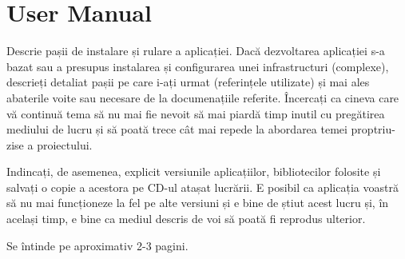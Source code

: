 
\chapter{User Manual}

\label{cap:user-manual}

Descrie pașii de instalare și rulare a aplicației. Dacă dezvoltarea aplicației s-a bazat sau a presupus instalarea și configurarea unei infrastructuri (complexe), descrieți detaliat pașii pe care i-ați urmat (referințele utilizate) și mai ales abaterile voite sau necesare de la documenațiile referite. Încercați ca cineva care vă continuă tema să nu mai fie nevoit să mai piardă timp inutil cu pregătirea mediului de lucru și să poată trece cât mai repede la abordarea temei proptriu-zise a proiectului. 

Indincați, de asemenea, explicit versiunile aplicațiilor, bibliotecilor folosite și salvați o copie a acestora pe CD-ul atașat lucrării. E posibil ca aplicația voastră să nu mai funcționeze la fel pe alte versiuni și e bine de știut acest lucru și,  în același timp, e bine ca mediul descris de voi să poată fi reprodus ulterior. 

Se întinde pe aproximativ 2-3 pagini. 

